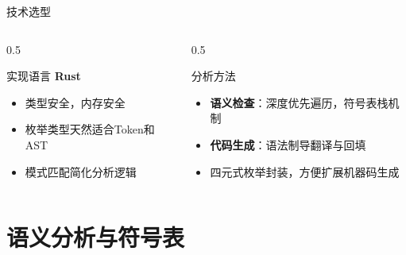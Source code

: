 \documentclass[aspectratio=169]{ctexbeamer}
\begin{document}
\begin{frame}{技术选型}
    \begin{columns}[T]
        \begin{column}{0.5\textwidth}
            \begin{block}{实现语言}
                \textbf{Rust}
                \begin{itemize}
                    \item 类型安全，内存安全
                    \item 枚举类型天然适合Token和AST
                    \item 模式匹配简化分析逻辑
                \end{itemize}
            \end{block}
        \end{column}
        \begin{column}{0.5\textwidth}
            \begin{block}{分析方法}
                \begin{itemize}
                    \item \textbf{语义检查}：深度优先遍历，符号表栈机制
                    \item \textbf{代码生成}：语法制导翻译与回填
                    \item 四元式枚举封装，方便扩展机器码生成
                \end{itemize}
            \end{block}
        \end{column}
    \end{columns}
\end{frame}

\section{语义分析与符号表}
\end{document}
